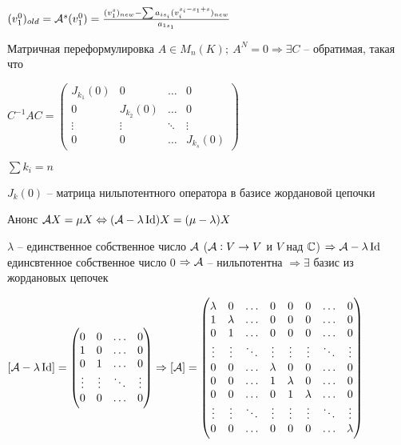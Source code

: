 \documentclass[12pt]{article}
\begin{document}
$(v_1^0)_{old} = \mathcal{A}^s(v_1^0) = \frac{(v_1^s)_{new} - \sum a_{i{s_i}}(v_i^{s_i - s_1 + s})_{new}}{a_{1{s_1}}}$

\begin{nota}{Матричная переформулировка}
    $A \in M_n(K);\ A^N = 0 \Rightarrow \exists C$ -- обратимая, такая что

    $C^{-1}AC = \begin{pmatrix}
        J_{k_1}(0) & 0 & \ldots & 0 \\
        0 & J_{k_2}(0) & \ldots & 0 \\
        \vdots & \vdots & \ddots & \vdots \\
        0 & 0 & \ldots & J_{k_s}(0)
    \end{pmatrix}$

    $\sum k_i = n$

    $J_k(0)$ -- матрица нильпотентного оператора в базисе жордановой цепочки
\end{nota}

\begin{Remark}{Анонс}
    $\mathcal{A} X = \mu X \Leftrightarrow (\mathcal{A} - \lambda \operatorname{Id})X = (\mu - \lambda)X$

    $\lambda$ -- единственное собственное число $\mathcal{A}$ ($\mathcal{A} : V \to V$ и $V$ над $\mathbb C$) $\Rightarrow \mathcal{A} - \lambda \operatorname{Id}$ единсвтенное собственное число 0 $\Rightarrow \mathcal{A}$ -- нильпотентна $\Rightarrow \exists$ базис из жордановых цепочек

    $[\mathcal{A} - \lambda \operatorname{Id}] = \begin{pmatrix}
        0 & 0 & \ldots & 0 \\
        1 & 0 & \ldots & 0 \\
        0 & 1 & \ldots & 0 \\
        \vdots & \vdots & \ddots & \vdots \\
        0 & 0 & \ldots & 0
    \end{pmatrix} \Rightarrow [\mathcal{A}] = \begin{pmatrix}
        \lambda & 0 & \ldots & 0 & 0 & 0 & \ldots & 0 \\
        1 & \lambda & \ldots & 0 & 0 & 0 & \ldots & 0 \\
        0 & 1 & \ldots & 0 & 0 & 0 & \ldots & 0 \\
        \vdots & \vdots & \ddots & \vdots & \vdots & \vdots & \ddots & \vdots \\
        0 & 0 & \ldots & \lambda & 0 & 0 & \ldots & 0 \\
        0 & 0 & \ldots & 1 & \lambda & 0 & \ldots & 0 \\
        0 & 0 & \ldots & 0 & 1 & \lambda & \ldots & 0 \\
        \vdots & \vdots & \ddots & \vdots & \vdots & \vdots & \ddots & \vdots \\
        0 & 0 & \ldots & 0 & 0 & 0 & \ldots & \lambda
    \end{pmatrix}$
\end{Remark}
\end{document}
